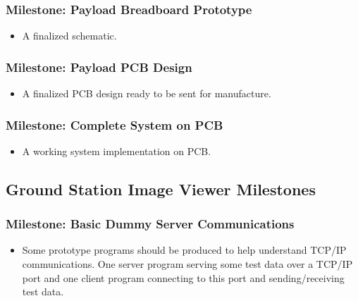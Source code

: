 

	\subsubsection{Milestone: Payload Breadboard Prototype}
		\label{sec:ms_phy_breadboard}
		\begin{itemize}
			\item A finalized schematic. 
		\end{itemize}

	\subsubsection{Milestone: Payload PCB Design}
		\label{sec:ms_phy_pcb_design}
		\begin{itemize}
			\item A finalized PCB design ready to be sent for manufacture. 
		\end{itemize}
		
	\subsubsection{Milestone: Complete System on PCB}
		\label{sec:ms_phy_pcb_complete}
		\begin{itemize}
			\item A working system implementation on PCB.
		\end{itemize}


\subsection{Ground Station Image Viewer Milestones}
	\subsubsection{Milestone: Basic Dummy Server Communications}
		\label{sec:ms_basic_dummy_server_comms}
		\begin{itemize}
			\item 	Some prototype programs should be produced to help understand TCP/IP communications.
				One server program serving some test data over a TCP/IP port and one
				client program connecting to this port and sending/receiving test data.
		\end{itemize}

